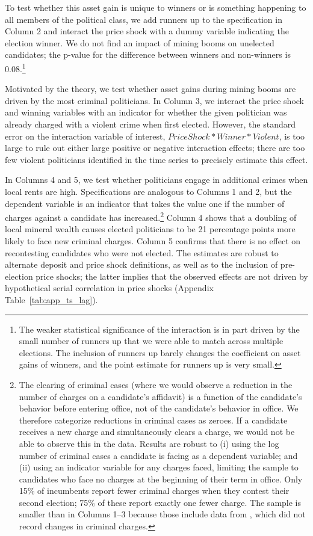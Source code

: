\documentclass[12pt,letterpaper]{article}
\begin{document}
To test whether this asset gain is
unique to winners or is something happening to all members of the
political class, we add runners up to the specification in Column 2
and interact the price shock with a dummy variable indicating the
election winner. We do not find an impact of mining booms on unelected
candidates; the p-value for the difference between winners and
non-winners is 0.08.\footnote{The weaker statistical significance of
  the interaction is in part driven by the small number of runners up
  that we were able to match across multiple elections. The inclusion
  of runners up barely changes the coefficient on asset gains of
  winners, and the point estimate for runners up is very small.}

Motivated by the theory, we test whether asset gains during mining
booms are driven by the most criminal politicians. In Column 3, we
interact the price shock and winning variables with an indicator for
whether the given politician was already charged with a violent crime
when first elected.  However, the standard error on the interaction
variable of interest, $Price Shock * Winner * Violent$, is too large
to rule out either large positive or negative interaction effects;
there are too few violent politicians identified in the time series to
precisely estimate this effect.

In Columns 4 and 5, we test whether politicians engage in additional
crimes when local rents are high.  Specifications are analogous to
Columns 1 and 2, but the dependent variable is an indicator that takes
the value one if the number of charges against a candidate has
increased.\footnote{The clearing of criminal cases (where we would
  observe a reduction in the number of charges on a candidate's
  affidavit) is a function of the candidate's behavior before entering
  office, not of the candidate's behavior in office. We therefore
  categorize reductions in criminal cases as zeroes. If a candidate
  receives a new charge and simultaneously clears a charge, we would
  not be able to observe this in the data. Results are robust to (i)
  using the log number of criminal cases a candidate is facing as a
  dependent variable; and (ii) using an indicator variable for any
  charges faced, limiting the sample to candidates who face no charges
  at the beginning of their term in office. Only 15\% of incumbents
  report fewer criminal charges when they contest their second
  election; 75\% of these report exactly one fewer charge. The sample
  is smaller than in Columns 1--3 because those include data from
  , which did not record changes in criminal
  charges.}  Column 4 shows that a doubling of local mineral wealth
causes elected politicians to be 21 percentage points more likely to
face new criminal charges. Column 5 confirms that there is no effect
on recontesting candidates who were not elected. The estimates are
robust to alternate deposit and price shock definitions, as well as to
the inclusion of pre-election price shocks; the latter implies that
the observed effects are not driven by hypothetical serial correlation
in price shocks (Appendix Table~\ref{tab:app_ts_lag}).
\end{document}
